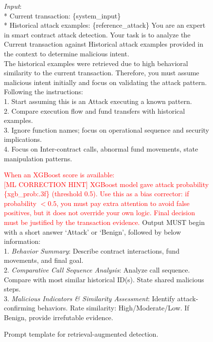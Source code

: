 \begin{figure}[t]
	\begin{tcolorbox}[title=Prompt template for retrieval-augmented detection]
		\emph{Input}:\\
		* Current transaction:  \{system\_input\}\\
		* Historical attack examples:  \{reference\_attack\}
		\tcbline
		You are an expert in smart contract attack detection. Your task is to analyze the Current transaction against Historical attack examples provided in the context to determine malicious intent.\\
		The historical examples were retrieved due to high behavioral similarity to the current transaction. Therefore, you must assume malicious intent initially and focus on validating the attack pattern.\\
		Following the instructions: \\
		1. Start assuming this is an Attack executing a known pattern. \\
		2. Compare execution flow and fund transfers with historical examples. \\
		3. Ignore function names; focus on operational sequence and security implications.\\
		4. Focus on Inter-contract calls, abnormal fund movements, state manipulation patterns.
		
		\tcbline
		\textcolor{red}{When an XGBoost score is available:}\\
		\textcolor{red}{[ML CORRECTION HINT] XGBoost model gave attack probability \{xgb\_prob:.3f\} (threshold 0.5). Use this as a bias corrector: if probability $<0.5$, you must pay extra attention to avoid false positives, but it does not override your own logic. Final decision must be justified by the transaction evidence.}
		\tcbline
		Output MUST begin with a short answer `Attack' or `Benign', followed by below information: \\ 
		1. \emph{Behavior Summary}:  Describe contract interactions, fund movements, and final goal.
		\\
		2. \emph{Comparative Call Sequence Analysis}:  Analyze call sequence. Compare with most similar historical ID(s). State shared malicious steps.\\
		3. \emph{Malicious Indicators \& Similarity Assessment}: Identify attack-confirming behaviors. Rate similarity: High/Moderate/Low. If Benign, provide irrefutable evidence.
	\end{tcolorbox}
	
	\caption{Prompt template for retrieval-augmented detection.}
	\label{fig:prompt1}
\end{figure}


